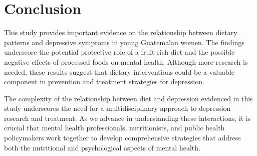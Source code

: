 \documentclass[jou]{apa7}
\begin{document}
\section{Conclusion}\label{conclusiuxf3n}

This study provides important evidence on the relationship between dietary patterns and depressive symptoms in young Guatemalan women. The findings underscore the potential protective role of a fruit-rich diet and the possible negative effects of processed foods on mental health. Although more research is needed, these results suggest that dietary interventions could be a valuable component in prevention and treatment strategies for depression.

The complexity of the relationship between diet and depression evidenced in this study underscores the need for a multidisciplinary approach to depression research and treatment. As we advance in understanding these interactions, it is crucial that mental health professionals, nutritionists, and public health policymakers work together to develop comprehensive strategies that address both the nutritional and psychological aspects of mental health.






\printbibliography
\end{document}
